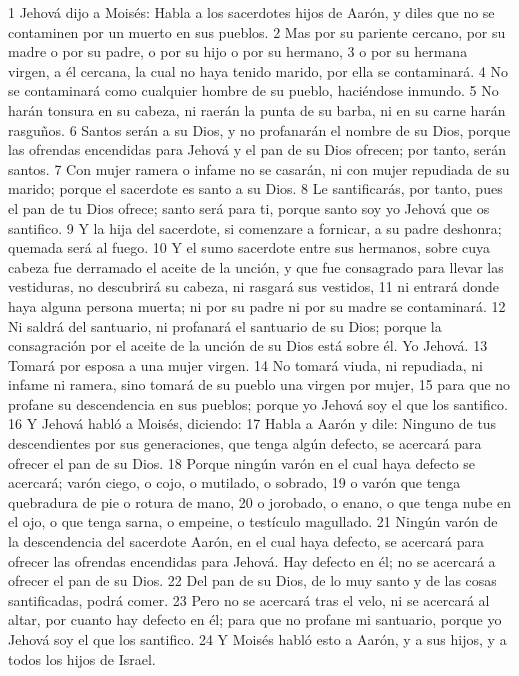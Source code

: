 1 Jehová dijo a Moisés: Habla a los sacerdotes hijos de Aarón, y diles que no se contaminen por un muerto en sus pueblos.
2 Mas por su pariente cercano, por su madre o por su padre, o por su hijo o por su hermano,
3 o por su hermana virgen, a él cercana, la cual no haya tenido marido, por ella se contaminará.
4 No se contaminará como cualquier hombre de su pueblo, haciéndose inmundo.
5 No harán tonsura en su cabeza, ni raerán la punta de su barba, ni en su carne harán rasguños.
6 Santos serán a su Dios, y no profanarán el nombre de su Dios, porque las ofrendas encendidas para Jehová y el pan de su Dios ofrecen; por tanto, serán santos.
7 Con mujer ramera o infame no se casarán, ni con mujer repudiada de su marido; porque el sacerdote es santo a su Dios.
8 Le santificarás, por tanto, pues el pan de tu Dios ofrece; santo será para ti, porque santo soy yo Jehová que os santifico.
9 Y la hija del sacerdote, si comenzare a fornicar, a su padre deshonra; quemada será al fuego.
10 Y el sumo sacerdote entre sus hermanos, sobre cuya cabeza fue derramado el aceite de la unción, y que fue consagrado para llevar las vestiduras, no descubrirá su cabeza, ni rasgará sus vestidos,
11 ni entrará donde haya alguna persona muerta; ni por su padre ni por su madre se contaminará.
12 Ni saldrá del santuario, ni profanará el santuario de su Dios; porque la consagración por el aceite de la unción de su Dios está sobre él. Yo Jehová.
13 Tomará por esposa a una mujer virgen.
14 No tomará viuda, ni repudiada, ni infame ni ramera, sino tomará de su pueblo una virgen por mujer,
15 para que no profane su descendencia en sus pueblos; porque yo Jehová soy el que los santifico.
16 Y Jehová habló a Moisés, diciendo:
17 Habla a Aarón y dile: Ninguno de tus descendientes por sus generaciones, que tenga algún defecto, se acercará para ofrecer el pan de su Dios.
18 Porque ningún varón en el cual haya defecto se acercará; varón ciego, o cojo, o mutilado, o sobrado,
19 o varón que tenga quebradura de pie o rotura de mano,
20 o jorobado, o enano, o que tenga nube en el ojo, o que tenga sarna, o empeine, o testículo magullado.
21 Ningún varón de la descendencia del sacerdote Aarón, en el cual haya defecto, se acercará para ofrecer las ofrendas encendidas para Jehová. Hay defecto en él; no se acercará a ofrecer el pan de su Dios.
22 Del pan de su Dios, de lo muy santo y de las cosas santificadas, podrá comer.
23 Pero no se acercará tras el velo, ni se acercará al altar, por cuanto hay defecto en él; para que no profane mi santuario, porque yo Jehová soy el que los santifico.
24 Y Moisés habló esto a Aarón, y a sus hijos, y a todos los hijos de Israel.  


